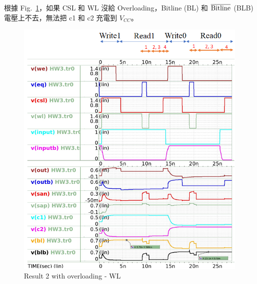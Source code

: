 \documentclass{article}
\begin{document}
\begin{enumerate}
根據 Fig.~\ref{2}，如果 CSL 和 WL 沒給 Overloading，Bitline (BL) 和 $\rm\overline{Bitline}$ (BLB) 電壓上不去，無法把 c1 和 c2 充電到 $V_{CC}$。
  \begin{figure}[H]
    \centering
    \includegraphics[width = \linewidth]{./img/2023-11-30-22-34-10.png}
    \caption{Result 2 with overloading - WL}
    \label{2}
    \end{figure}


\end{enumerate}
\end{document}

